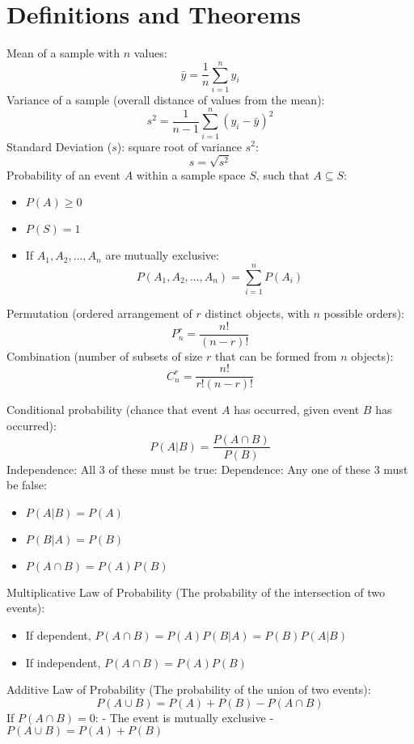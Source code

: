 \documentclass{article}
\begin{document}
\section*{Definitions and Theorems}
Mean of a sample with \( n \) values:
\[
\bar{y} = \frac{1}{n} \sum_{i=1}^{n} y_i
\]
Variance of a sample (overall distance of values from the mean):
\[
s^2 = \frac{1}{n - 1} \sum_{i=1}^{n} (y_i - \bar{y})^2
\]
Standard Deviation (\( s \)): square root of variance \( s^2 \):
\[
s = \sqrt{s^2}
\]
Probability of an event \( A \) within a sample space \( S \), such that \( A \subseteq S \):
\begin{itemize}
    \item \( P(A) \geq 0 \)
    \item \( P(S) = 1 \)
    \item If \( A_1, A_2, \dots, A_n \) are mutually exclusive:
    \[
    P(A_1, A_2, \dots, A_n) = \sum_{i=1}^{n} P(A_i)
    \]
\end{itemize}
Permutation (ordered arrangement of \( r \) distinct objects, with \( n \) possible orders):
\[
P^r_n = \frac{n!}{(n - r)!}
\]
Combination (number of subsets of size \( r \) that can be formed from \( n \) objects):
\[
C^r_n = \frac{n!}{r! (n - r)!}
\]

Conditional probability (chance that event \( A \) has occurred, given event \( B \) has occurred):
\[
P(A|B) = \frac{P(A \cap B)}{P(B)}
\]
Independence: All 3 of these must be true:
Dependence: Any one of these 3 must be false:
\begin{itemize}
    \item \( P(A|B) = P(A) \)
    \item \( P(B|A) = P(B) \)
    \item \( P(A \cap B) = P(A) P(B) \)
\end{itemize}

Multiplicative Law of Probability (The probability of the intersection of two events):
\begin{itemize}
    \item If dependent, \( P(A \cap B) = P(A) P(B|A) = P(B) P(A|B) \)
    \item If independent, \( P(A \cap B) = P(A) P(B) \)
\end{itemize}

Additive Law of Probability (The probability of the union of two events):
\[
P(A \cup B) = P(A) + P(B) - P(A \cap B)
\]
If \( P(A \cap B) = 0 \):
    - The event is mutually exclusive
    - \( P(A \cup B) = P(A) + P(B) \)
\end{document}

